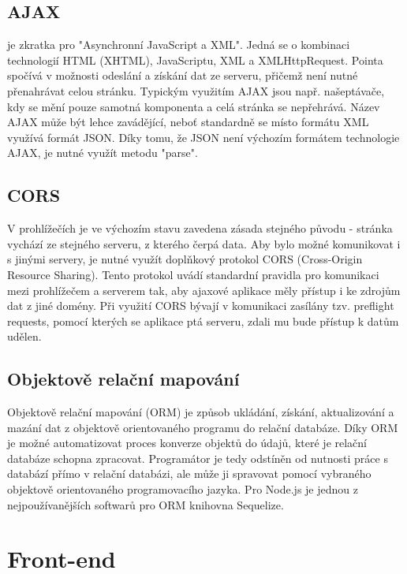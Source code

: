 
\subsection{AJAX}
je zkratka pro "Asynchronní JavaScript a XML". Jedná se o kombinaci technologií HTML (XHTML), JavaScriptu, XML a XMLHttpRequest. Pointa spočívá v možnosti odeslání a získání dat ze serveru, přičemž není nutné přenahrávat celou stránku. Typickým využitím AJAX jsou např. našeptávače, kdy se mění pouze samotná komponenta a celá stránka se nepřehrává. Název AJAX může být lehce zavádějící, neboť standardně se místo formátu XML využívá formát JSON. Díky tomu, že JSON není výchozím formátem technologie AJAX, je nutné využít metodu "parse". \cite{Ajax}

\subsection{CORS}
V prohlížečích je ve výchozím stavu zavedena zásada stejného původu - stránka vychází ze stejného serveru, z kterého čerpá data. Aby bylo možné komunikovat i s jinými servery, je nutné využít doplňkový protokol CORS (Cross-Origin Resource Sharing). Tento protokol uvádí standardní pravidla pro komunikaci mezi prohlížečem a serverem tak, aby ajaxové aplikace měly přístup i ke zdrojům dat z jiné domény. Při využití CORS bývají v komunikaci zasílány tzv. preflight requests, pomocí kterých se aplikace ptá serveru, zdali mu bude přístup k datům udělen. \cite{CORS}

\subsection{Objektově relační mapování}
Objektově relační mapování (ORM) je způsob ukládání, získání, aktualizování a mazání dat z objektově orientovaného programu do relační databáze. Díky ORM je možné automatizovat proces konverze objektů do údajů, které je relační databáze schopna zpracovat. Programátor je tedy odstíněn od nutnosti práce s databází přímo v relační databázi, ale může ji spravovat pomocí vybraného objektově orientovaného programovacího jazyka. Pro Node.js je jednou z nejpoužívanějších softwarů pro ORM knihovna Sequelize.

\section{Front-end}

